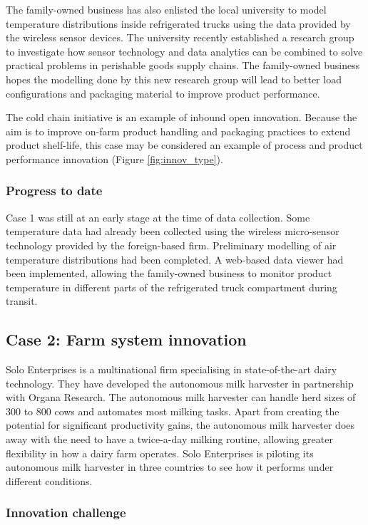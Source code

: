 The family-owned business has also enlisted the local university to model temperature distributions inside refrigerated trucks using the data provided by the wireless sensor devices. The university recently established a research group to investigate how sensor technology and data analytics can be combined to solve practical problems in perishable goods supply chains. The family-owned business hopes the modelling done by this new research group will lead to better load configurations and packaging material to improve product performance. \medskip

The cold chain initiative is an example of inbound open innovation. Because the aim is to improve on-farm product handling and packaging practices to extend product shelf-life, this case may be considered an example of process and product performance innovation (Figure \ref{fig:innov_type}). 

\subsubsection{Progress to date}

Case 1 was still at an early stage at the time of data collection. Some temperature data had already been collected using the wireless micro-sensor technology provided by the foreign-based firm. Preliminary modelling of air temperature distributions had been completed. A web-based data viewer had been implemented, allowing the family-owned business to monitor product temperature in different parts of the refrigerated truck compartment during transit. \medskip

\subsection{Case 2: Farm system innovation}

Solo Enterprises is a multinational firm specialising in state-of-the-art dairy technology. They have developed the autonomous milk harvester in partnership with Organa Research. The autonomous milk harvester can handle herd sizes of 300 to 800 cows and automates most milking tasks. Apart from creating the potential for significant productivity gains, the autonomous milk harvester does away with the need to have a twice-a-day milking routine, allowing greater flexibility in how a dairy farm operates. Solo Enterprises is piloting its autonomous milk harvester in three countries to see how it performs under different conditions. 

\subsubsection{Innovation challenge}

